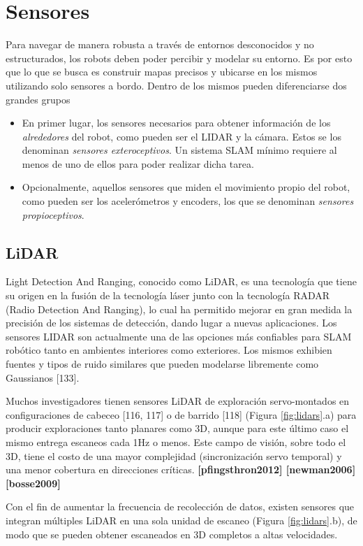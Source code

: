 \section{Sensores}
Para navegar de manera robusta a través de entornos desconocidos y no estructurados, los robots deben poder percibir y modelar su entorno. Es por esto que lo que se busca es construir mapas precisos y ubicarse en los mismos utilizando solo sensores a bordo. Dentro de los mismos pueden diferenciarse dos grandes grupos
\begin{itemize}
    \item En primer lugar, los sensores necesarios para obtener información de los \textit{alrededores} del robot, como pueden ser el LIDAR y la cámara. Estos se los denominan \textit{sensores exteroceptivos}. Un sistema SLAM mínimo requiere al menos de uno de ellos para poder realizar dicha tarea.
    \item Opcionalmente, aquellos sensores que miden el movimiento propio del robot, como pueden ser los acelerómetros y encoders, los que se denominan \textit{sensores propioceptivos}.
\end{itemize}

\subsection{LiDAR}
Light Detection And Ranging, conocido como LiDAR, es una tecnología que tiene su origen en la fusión de la tecnología láser junto con la tecnología RADAR (Radio Detection And Ranging), lo cual ha permitido mejorar en gran medida la precisión de los sistemas de detección, dando lugar a nuevas aplicaciones. Los sensores LIDAR son actualmente una de las opciones más confiables para SLAM robótico tanto en ambientes interiores como exteriores. Los mismos exhibien fuentes y tipos de ruido similares que pueden modelarse libremente como Gaussianos [133].

Muchos investigadores tienen sensores LiDAR de exploración servo-montados en configuraciones de cabeceo [116, 117] o de barrido [118] (Figura \ref{fig:lidars}.a) para producir exploraciones tanto planares como 3D, aunque para este último caso el mismo entrega escaneos cada 1Hz o menos. Este campo de visión, sobre todo el 3D, tiene el costo de una mayor complejidad (sincronización servo temporal) y una menor cobertura en direcciones críticas.
\textbf{[pfingsthron2012] [newman2006] [bosse2009]}

Con el fin de aumentar la frecuencia de recolección de datos, existen sensores que integran múltiples LiDAR en una sola unidad de escaneo (Figura \ref{fig:lidars}.b), de modo que se pueden obtener escaneados en 3D completos a altas velocidades.

